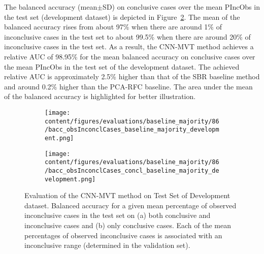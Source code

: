 The balanced accuracy (mean$\pm$SD) on conclusive cases over the mean PIncObs
in the test set (development dataset) 
is depicted in Figure~\ref{fig:bacc_obsInconclCases_concl_baseline_majority_development}.
The mean of the balanced accuracy rises from about 97\% 
when there are around 1\% of inconclusive cases in the test set to about 99.5\% 
when there are around 20\% of inconclusive cases in the test set.
As a result, the CNN-MVT method achieves a relative AUC of 98.95\% for the mean balanced accuracy on conclusive cases
over the mean PIncObs in the test set of the development dataset.
The achieved relative AUC is approximately 2.5\% higher than that of the SBR baseline method 
and around 0.2\% higher than the PCA-RFC baseline.
The area under the mean of the balanced accuracy is highlighted for better illustration.


\begin{figure}[ht]
  \begin{subfigure}{0.9\textwidth}
    \centering
    \texttt{[image: content/figures/evaluations/baseline\_majority/86/bacc\_obsInconclCases\_baseline\_majority\_development.png]}
    \subcaption{}
    \label{fig:bacc_obsInconclCases_baseline_majority_development}
  \end{subfigure}
  \hfill
  \begin{subfigure}{0.9\textwidth}
    \centering
    \texttt{[image: content/figures/evaluations/baseline\_majority/86/bacc\_obsInconclCases\_concl\_baseline\_majority\_development.png]}
    \subcaption{}
    \label{fig:bacc_obsInconclCases_concl_baseline_majority_development}
  \end{subfigure}

  \caption{Evaluation of the CNN-MVT method on Test Set of Development dataset.
  Balanced accuracy for a given mean percentage of observed inconclusive cases in the test set on 
  (a) both conclusive and inconclusive cases and (b) only conclusive cases. 
  Each of the mean percentages of observed inconclusive cases is associated with an inconclusive range (determined in the validation set). }
  \label{fig:bacc_obsInconclCases_baseline_majority_development_full}
\end{figure}



